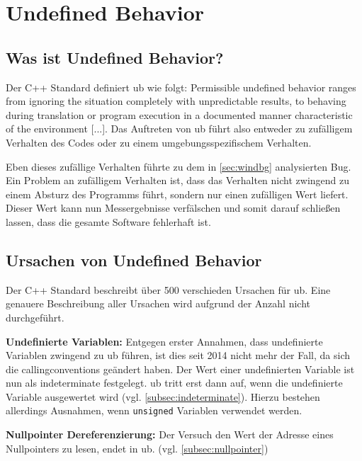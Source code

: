 \chapter{Undefined Behavior}
\label{ch:ub}

\section{Was ist Undefined Behavior?}
\label{sec:ub_was}

Der C++ Standard definiert \gls{ub} wie folgt: \newline
\glqq{}Permissible undefined behavior ranges from ignoring the situation completely with unpredictable results, to behaving during translation or program execution in a
documented manner characteristic of the environment [...]\grqq{}.\cite[S.8]{book:cpp-standard} \newline
Das Auftreten von \gls{ub} führt also entweder zu zufälligem Verhalten des Codes oder zu einem umgebungsspezifischem Verhalten.

Eben dieses zufällige Verhalten führte zu dem in \ref{sec:windbg} analysierten Bug. Ein Problem an zufälligem Verhalten ist, dass das Verhalten nicht zwingend zu einem
Absturz des Programms führt, sondern nur einen zufälligen Wert liefert. Dieser Wert kann nun Messergebnisse verfälschen und somit darauf schließen lassen, dass die gesamte
Software fehlerhaft ist.

\section{Ursachen von Undefined Behavior}
\label{sec:ub_ursachen}

Der C++ Standard\cite{book:cpp-standard} beschreibt über 500 verschieden Ursachen für \gls{ub}. Eine genauere Beschreibung aller Ursachen wird aufgrund der Anzahl nicht durchgeführt.

\textbf{Undefinierte Variablen:} Entgegen erster Annahmen, dass undefinierte Variablen zwingend zu \gls{ub} führen, ist dies seit 2014 nicht mehr der Fall, da sich die
\glspl{callingconvention} geändert haben. Der Wert einer undefinierten Variable ist nun als \glqq{}indeterminate\grqq{} festgelegt\cite[S.63]{book:cpp-standard}.
\gls{ub} tritt erst dann auf, wenn die undefinierte Variable ausgewertet wird (vgl. \ref{subsec:indeterminate}). Hierzu bestehen allerdings Ausnahmen, wenn \verb|unsigned|
Variablen verwendet werden. \cite[S.63]{book:cpp-standard}

\textbf{Nullpointer Dereferenzierung:} Der Versuch den Wert der Adresse eines Nullpointers zu lesen, endet in \gls{ub}. \cite[S.188]{book:cpp-standard} (vgl. \ref{subsec:nullpointer})

